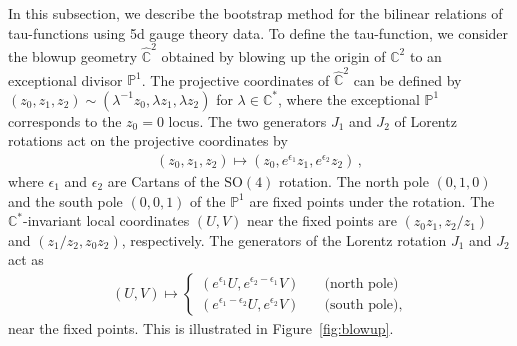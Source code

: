 \documentclass[11pt, a4paper]{article}
\theoremstyle{definition}
\begin{document}
In this subsection, we describe the bootstrap method for the bilinear relations of tau-functions using 5d gauge theory data. To define the tau-function, we consider the blowup geometry $ \hat{\mathbb{C}}^2 $ obtained by blowing up the origin of $ \mathbb{C}^2 $ to an exceptional divisor $ \mathbb{P}^1 $. The projective coordinates of $ \hat{\mathbb{C}}^2 $ can be defined by $ (z_0, z_1, z_2) \sim (\lambda^{-1} z_0, \lambda z_1, \lambda z_2) $ for $ \lambda \in \mathbb{C}^* $, where the exceptional $ \mathbb{P}^1 $ corresponds to the $ z_0=0 $ locus. The two generators $ J_1 $ and $ J_2 $ of Lorentz rotations act on the projective coordinates by
\begin{align}
    (z_0, z_1, z_2) \mapsto (z_0, e^{\epsilon_1} z_1, e^{\epsilon_2} z_2)  \, ,
\end{align}
where $ \epsilon_1 $ and $ \epsilon_2 $ are Cartans of the $ \mathrm{SO}(4) $ rotation. The north pole $ (0,1,0) $ and the south pole $ (0,0,1) $ of the $ \mathbb{P}^1 $ are fixed points under the rotation. The $ \mathbb{C}^* $-invariant local coordinates $ (U,V) $ near the fixed points are $ (z_0 z_1, z_2/z_1) $ and $ (z_1/z_2, z_0z_2) $, respectively. The generators of the Lorentz rotation $ J_1 $ and $ J_2 $ act as
\begin{align}\label{eq:local-coord}
    (U,V) \mapsto \left\{\begin{array}{ll}
            (e^{\epsilon_1} U, e^{\epsilon_2-\epsilon_1}V ) & \quad \text{(north pole)} \\
            (e^{\epsilon_1-\epsilon_2} U, e^{\epsilon_2}V ) & \quad \text{(south pole),}
    \end{array}\right.
\end{align}
near the fixed points. This is illustrated in Figure~\ref{fig:blowup}.
\end{document}
